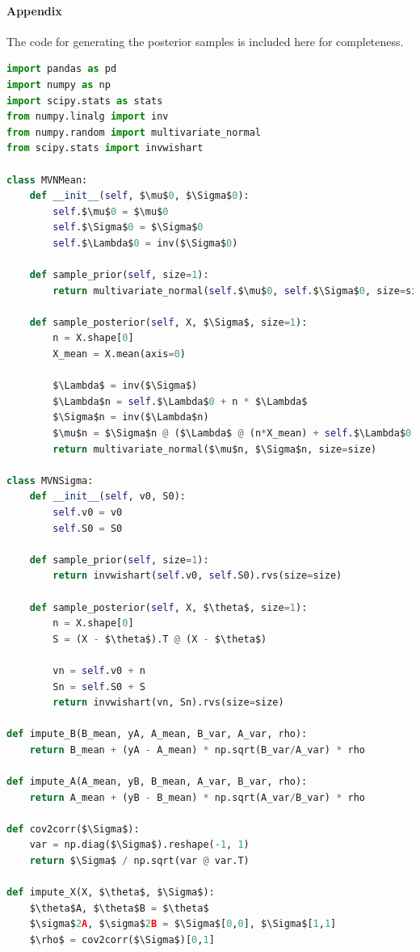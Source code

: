 \documentclass[11pt, letterpaper]{article}
\begin{document}
\paragraph{Appendix}
The code for generating the posterior samples is included here for completeness.
\begin{lstlisting}[language=Python]
import pandas as pd
import numpy as np
import scipy.stats as stats
from numpy.linalg import inv
from numpy.random import multivariate_normal
from scipy.stats import invwishart

class MVNMean:
    def __init__(self, $\mu$0, $\Sigma$0):
        self.$\mu$0 = $\mu$0
        self.$\Sigma$0 = $\Sigma$0
        self.$\Lambda$0 = inv($\Sigma$0)
    
    def sample_prior(self, size=1):
        return multivariate_normal(self.$\mu$0, self.$\Sigma$0, size=size)
    
    def sample_posterior(self, X, $\Sigma$, size=1):
        n = X.shape[0]
        X_mean = X.mean(axis=0)

        $\Lambda$ = inv($\Sigma$)
        $\Lambda$n = self.$\Lambda$0 + n * $\Lambda$
        $\Sigma$n = inv($\Lambda$n)
        $\mu$n = $\Sigma$n @ ($\Lambda$ @ (n*X_mean) + self.$\Lambda$0 @ self.$\mu$0)
        return multivariate_normal($\mu$n, $\Sigma$n, size=size)

class MVNSigma:
    def __init__(self, v0, S0):
        self.v0 = v0
        self.S0 = S0
    
    def sample_prior(self, size=1):
        return invwishart(self.v0, self.S0).rvs(size=size)
    
    def sample_posterior(self, X, $\theta$, size=1):
        n = X.shape[0]
        S = (X - $\theta$).T @ (X - $\theta$)

        vn = self.v0 + n
        Sn = self.S0 + S
        return invwishart(vn, Sn).rvs(size=size)

def impute_B(B_mean, yA, A_mean, B_var, A_var, rho):
    return B_mean + (yA - A_mean) * np.sqrt(B_var/A_var) * rho

def impute_A(A_mean, yB, B_mean, A_var, B_var, rho):
    return A_mean + (yB - B_mean) * np.sqrt(A_var/B_var) * rho

def cov2corr($\Sigma$):
    var = np.diag($\Sigma$).reshape(-1, 1)
    return $\Sigma$ / np.sqrt(var @ var.T)

def impute_X(X, $\theta$, $\Sigma$):
    $\theta$A, $\theta$B = $\theta$
    $\sigma$2A, $\sigma$2B = $\Sigma$[0,0], $\Sigma$[1,1]
    $\rho$ = cov2corr($\Sigma$)[0,1]


\end{lstlisting}
\end{document}
